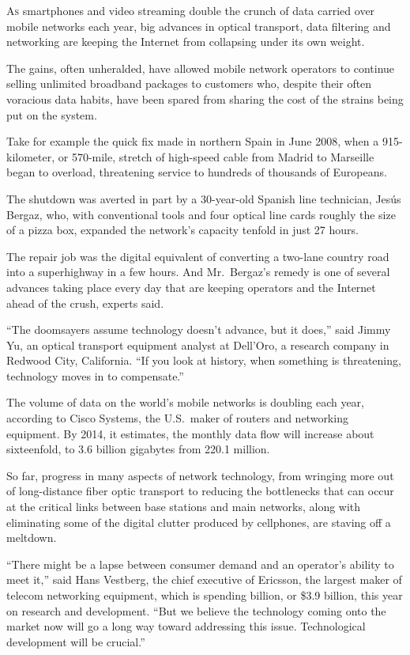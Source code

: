 ﻿\documentclass[12pt]{article}
\begin{document}
\lettrine{A}{s} smartphones and video streaming double the crunch of data
carried over mobile networks each year, big advances in optical transport, data filtering and
networking are keeping the Internet from collapsing under its own weight.

The gains, often unheralded, have allowed mobile network operators to continue selling unlimited
broadband packages to customers who, despite their often voracious data habits, have been spared
from sharing the cost of the strains being put on the system.

Take for example the quick fix made in northern Spain in June 2008, when a 915-kilometer, or
570-mile, stretch of high-speed cable from Madrid to Marseille began to overload, threatening
service to hundreds of thousands of Europeans.

The shutdown was averted in part by a 30-year-old Spanish line technician, Jesús Bergaz, who, with
conventional tools and four optical line cards roughly the size of a pizza box, expanded the
network's capacity tenfold in just 27 hours.

The repair job was the digital equivalent of converting a two-lane country road into a superhighway
in a few hours. And Mr.~Bergaz's remedy is one of several advances taking place every day that are
keeping operators and the Internet ahead of the crush, experts said.

``The doomsayers assume technology doesn't advance, but it does,'' said Jimmy Yu, an optical
transport equipment analyst at Dell'Oro, a research company in Redwood City, California. ``If you
look at history, when something is threatening, technology moves in to compensate.''

The volume of data on the world's mobile networks is doubling each year, according to Cisco Systems,
the U.S.~maker of routers and networking equipment. By 2014, it estimates, the monthly data flow
will increase about sixteenfold, to 3.6 billion gigabytes from 220.1 million.

So far, progress in many aspects of network technology, from wringing more out of long-distance
fiber optic transport to reducing the bottlenecks that can occur at the critical links between base
stations and main networks, along with eliminating some of the digital clutter produced by
cellphones, are staving off a meltdown.

``There might be a lapse between consumer demand and an operator's ability to meet it,'' said Hans
Vestberg, the chief executive of Ericsson, the largest maker of telecom networking equipment, which
is spending  billion, or \$3.9 billion, this year on research and development. ``But we
believe the technology coming onto the market now will go a long way toward addressing this issue.
Technological development will be crucial.''
\end{document}
